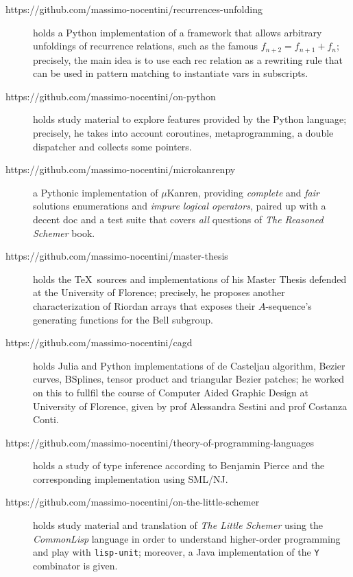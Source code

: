 \documentclass[a4paper]{tufte-handout}
\begin{document}
\begin{description}
        \item[https://github.com/massimo-nocentini/recurrences-unfolding] holds
        a Python implementation of a framework that allows arbitrary unfoldings
        of recurrence relations, such as the famous $f_{n+2}=f_{n+1}+f_{n}$;
        precisely, the main idea is to use each rec relation as a rewriting
        rule that can be used in pattern matching to instantiate vars in
        subscripts. 

        \item[https://github.com/massimo-nocentini/on-python] holds study
        material to explore features provided by the Python language;
        precisely, he takes into account coroutines, metaprogramming, a double
        dispatcher and collects some pointers.

        \item[https://github.com/massimo-nocentini/microkanrenpy] a Pythonic
        implementation of $\mu$Kanren, providing \textit{complete} and
        \textit{fair} solutions enumerations and \textit{impure logical
        operators}, paired up with a decent doc and a test suite that covers
        \textit{all} questions of \textit{The Reasoned Schemer} book.

        \item[https://github.com/massimo-nocentini/master-thesis] holds the
        \TeX\, sources and implementations of his Master Thesis defended at the
        University of Florence; precisely, he proposes another characterization
        of Riordan arrays that exposes their $A$-sequence's generating
        functions for the Bell subgroup.

        \item[https://github.com/massimo-nocentini/cagd] holds Julia and Python
        implementations of de Casteljau algorithm, Bezier curves, BSplines,
        tensor product and triangular Bezier patches; he worked on this to
        fullfil the  course of Computer Aided Graphic Design at University of
        Florence, given by prof Alessandra Sestini and prof Costanza Conti.

        \item[https://github.com/massimo-nocentini/theory-of-programming-languages]
        holds a study of type inference according to Benjamin Pierce
         and
        the corresponding implementation using SML/NJ.

        \item[https://github.com/massimo-nocentini/on-the-little-schemer] holds
        study material and translation of \textit{The Little Schemer} using the
        \textit{CommonLisp} language in order to understand higher-order
        programming and play with \verb|lisp-unit|; moreover, a Java
        implementation of the \verb|Y| combinator is given.


\end{description}
\end{document}
